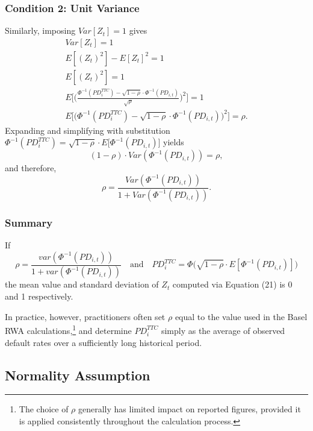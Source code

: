 \documentclass[11pt,a4paper]{article}
\begin{document}
\subsubsection{Condition 2: Unit Variance}
Similarly, imposing $Var[Z_t] = 1$ gives
\begin{equation}
\begin{aligned}
Var[Z_t] = 1 \\
E[(Z_t)^2] - E[Z_t]^2 = 1 \\
E[(Z_t)^2] = 1 \\
E \Bigg[\Bigg(\frac{\Phi^{-1}(PD_i^{TTC}) - \sqrt{1 - \rho} \cdot \Phi^{-1}(PD_{i,t})}{\sqrt{\rho}}\Bigg)^2\Bigg] = 1 \\
E \Bigg[\Bigg(\Phi^{-1}(PD_i^{TTC}) - \sqrt{1 - \rho} \cdot \Phi^{-1}(PD_{i,t})\Bigg)^2\Bigg] = \rho.
\end{aligned}
\end{equation}
Expanding and simplifying with substitution $\Phi^{-1}(PD_i^{TTC}) = \sqrt{1 - \rho} \cdot E \Big[\Phi^{-1}(PD_{i, t}) \Big]$ yields
\begin{equation}
(1 - \rho) \cdot Var(\Phi^{-1}(PD_{i, t})) = \rho,
\end{equation}
and therefore,
\begin{equation}
\rho = \frac{Var(\Phi^{-1}(PD_{i, t}))}{1 + Var(\Phi^{-1}(PD_{i, t}))}.
\end{equation}

\subsubsection{Summary}
If
\begin{equation}
\rho = \frac{var(\Phi^{-1}(PD_{i, t}))}{1 + var(\Phi^{-1}(PD_{i, t}))} \quad \text{and} \quad PD_i^{TTC} = \Phi \Big( \sqrt{1 - \rho} \cdot E [\Phi^{-1}(PD_{i, t})] \Big)
\end{equation}
the mean value and standard deviation of $Z_t$ computed via Equation (21) is 0 and 1 respectively.

In practice, however, practitioners often set $\rho$ equal to the value used in the Basel RWA calculations,\footnote{The choice of $\rho$ generally has limited impact on reported figures, provided it is applied consistently throughout the calculation process.} and determine $PD_i^{TTC}$ simply as the average of observed default rates over a sufficiently long historical period.

\subsection{Normality Assumption}
\end{document}
